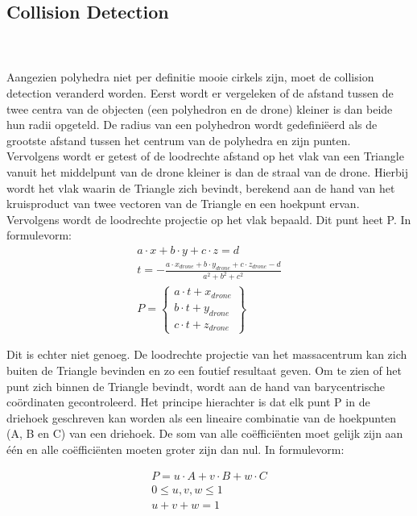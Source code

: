 \subsection{Collision Detection}
\\\\
Aangezien polyhedra niet per definitie mooie cirkels zijn, moet de collision detection veranderd worden. Eerst wordt er vergeleken of de afstand tussen de twee centra van de objecten (een polyhedron en de drone) kleiner is dan beide hun radii opgeteld. De radius van een polyhedron wordt gedefiniëerd als de grootste afstand tussen het centrum van de polyhedra en zijn punten. \\
\noindent
Vervolgens wordt er getest of de loodrechte afstand op het vlak van een Triangle vanuit het middelpunt van de drone kleiner is dan de straal van de drone. Hierbij wordt het vlak waarin de Triangle zich bevindt, berekend aan de hand van het kruisproduct van twee vectoren van de Triangle en een hoekpunt ervan. Vervolgens wordt de loodrechte projectie op het vlak bepaald. Dit punt heet P. In formulevorm: 
\begin{gather*}
	a\cdot x + b\cdot y + c\cdot z = d \\ 
	t = -\frac{a \cdot x_{drone} + b \cdot y_{drone} + c \cdot z_{drone} - d}{a^2 + b^2 + c^2}  \\ P =
	\begin{Bmatrix}
	a\cdot t + x_{drone}\\ 
	b\cdot t + y_{drone}\\ 
	c\cdot t + z_{drone}
	\end{Bmatrix}
\end{gather*}

\noindent
 Dit is echter niet genoeg. De loodrechte projectie van het massacentrum  kan zich buiten de Triangle bevinden en zo een foutief resultaat geven. Om te zien of het punt zich binnen de Triangle bevindt, wordt aan de hand van barycentrische coördinaten gecontroleerd. Het principe hierachter is dat elk punt P in de driehoek geschreven kan worden als een lineaire combinatie van de hoekpunten (A, B en C) van een driehoek. De som van alle co\"effici\"enten moet gelijk zijn aan één en alle co\"effici\"enten moeten groter zijn dan nul. In formulevorm:
 
 \begin{gather*}
 	P = u\cdot A + v\cdot B + w\cdot C \\
 	0 \le u,v,w \le 1 \\
 	u + v + w = 1
 \end{gather*}

